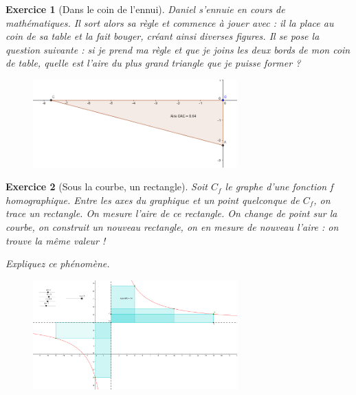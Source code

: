 \documentclass[12pt]{article}
\theoremstyle{break}
\newtheorem{exo}{Exercice}
\begin{document}
\begin{exo}[Dans le coin de l'ennui]
Daniel s'ennuie en cours de mathématiques. Il sort alors sa règle et commence à jouer avec : il la place au coin de sa table et la fait bouger, créant ainsi diverses figures. Il se pose la question suivante : si je prend ma règle et que je joins les deux bords de mon coin de table, quelle est l'aire du plus grand triangle que je puisse former ?

\begin{figure}[h!]
	\centering
    \includegraphics[width=0.7\textwidth]{TriangleCoinDeTable.png}
    
\end{figure}
\end{exo}


\begin{exo}[Sous la courbe, un rectangle]
Soit $C_f$ le graphe d'une fonction f homographique. Entre les axes du graphique et un point quelconque de $C_f$, on trace un rectangle. On mesure l'aire de ce rectangle. On change de point sur la courbe, on construit un nouveau rectangle, on en mesure de nouveau l'aire : on trouve la même valeur !

Expliquez ce phénomène.
\begin{figure}[h!]
	\centering
    \includegraphics[width=0.7\textwidth]{RectangleHomographique.png}
    
\end{figure}
\end{exo}
\end{document}
